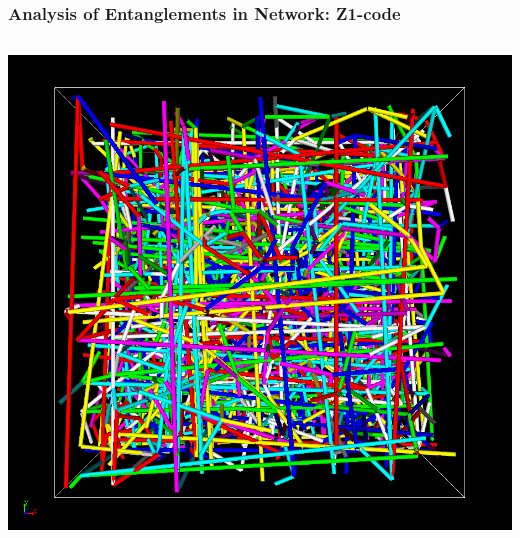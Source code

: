 \documentclass[12pt, dvipdfmx]{beamer}
\begin{document}
\begin{frame}
\end{frame}

\begin{frame}
    \frametitle{Analysis of Entanglements in Network: Z1-code}
        \vspace{-2mm}
        \begin{columns}[onlytextwidth][c]
                \includegraphics[width=\textwidth]{z_cord_4Chain.png}
				

\end{columns}
\end{frame}
\end{document}

